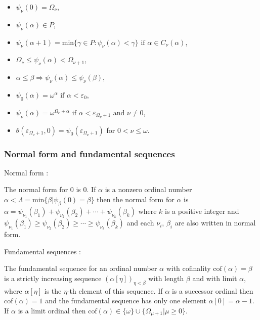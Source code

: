 \documentclass[10pt]{article}
\begin{document}
\begin{itemize}
     \setlength{\itemsep}{1pt}
     \setlength{\parskip}{0pt}
     \setlength{\parsep}{0pt}
\item \(\psi_\nu(0)=\Omega_\nu\),
\item \(\psi_\nu(\alpha)\in P\),
\item \(\psi_\nu(\alpha+1)=\text{min}\{\gamma\in P: \psi_\nu(\alpha)<\gamma\}\text{ if }\alpha\in C_\nu(\alpha)\),
\item \(\Omega_\nu\le\psi_\nu(\alpha)<\Omega_{\nu+1}\),
\item \(\alpha\le\beta\Rightarrow\psi_\nu(\alpha)\le\psi_\nu(\beta)\),
\item \(\psi_0(\alpha)=\omega^\alpha \text{ if }\alpha<\varepsilon_0\),
\item \(\psi_\nu(\alpha)=\omega^{\Omega_\nu+\alpha} \text{ if }\alpha<\varepsilon_{\Omega_\nu+1} \text{ and } \nu\neq 0\),
\item \(\theta(\varepsilon_{\Omega_\nu+1},0)=\psi_0(\varepsilon_{\Omega_\nu+1})\) for \(0<\nu\le\omega\).
\end{itemize}

\subsubsection{Normal form and fundamental sequences}

Normal form :

The normal form for 0 is 0. If \(\alpha\) is a nonzero ordinal number \(\alpha<\Lambda=\text{min}\{\beta|\psi_\beta(0)=\beta\}\) then the normal form for \(\alpha\) is \(\alpha=\psi_{\nu_1}(\beta_1)+\psi_{\nu_2}(\beta_2)+\cdots+\psi_{\nu_k}(\beta_k)\) where \(k\) is a positive integer and \(\psi_{\nu_1}(\beta_1)\geq\psi_{\nu_2}(\beta_2)\geq\cdots\geq\psi_{\nu_k}(\beta_k)\) and each \(\nu_i\), \(\beta_i\) are also written in normal form.

Fundamental sequences :

The fundamental sequence for an ordinal number \(\alpha\) with cofinality \(\text{cof}(\alpha)=\beta\) is a strictly increasing sequence \((\alpha[\eta])_{\eta<\beta}\) with length \(\beta\) and with limit \(\alpha\), where \(\alpha[\eta]\) is the \(\eta\)-th element of this sequence. If \(\alpha\) is a successor ordinal then \(\text{cof}(\alpha)=1\) and the fundamental sequence has only one element \(\alpha[0]=\alpha-1\). If \(\alpha\) is a limit ordinal then \(\text{cof}(\alpha)\in\{\omega\}\cup\{\Omega_{\mu+1}|\mu\geq 0\}\).
\end{document}
